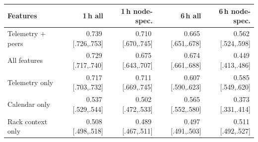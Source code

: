 \begin{tabular}{lrrrr}
\toprule
Features & 1\,h all & 1\,h node-spec. & 6\,h all & 6\,h node-spec. \\
\midrule
Telemetry + peers & 0.739\,{\scriptsize[.726,.753]} & 0.710\,{\scriptsize[.670,.745]} & 0.665\,{\scriptsize[.651,.678]} & 0.562\,{\scriptsize[.524,.598]} \\
All features & 0.729\,{\scriptsize[.717,.740]} & 0.675\,{\scriptsize[.643,.707]} & 0.674\,{\scriptsize[.661,.688]} & 0.449\,{\scriptsize[.413,.486]} \\
Telemetry only & 0.717\,{\scriptsize[.703,.732]} & 0.711\,{\scriptsize[.669,.745]} & 0.607\,{\scriptsize[.590,.623]} & 0.585\,{\scriptsize[.549,.620]} \\
Calendar only & 0.537\,{\scriptsize[.529,.544]} & 0.502\,{\scriptsize[.472,.533]} & 0.565\,{\scriptsize[.552,.580]} & 0.373\,{\scriptsize[.331,.414]} \\
Rack context only & 0.508\,{\scriptsize[.498,.518]} & 0.489\,{\scriptsize[.467,.511]} & 0.497\,{\scriptsize[.491,.503]} & 0.511\,{\scriptsize[.492,.527]} \\
\bottomrule
\end{tabular}

